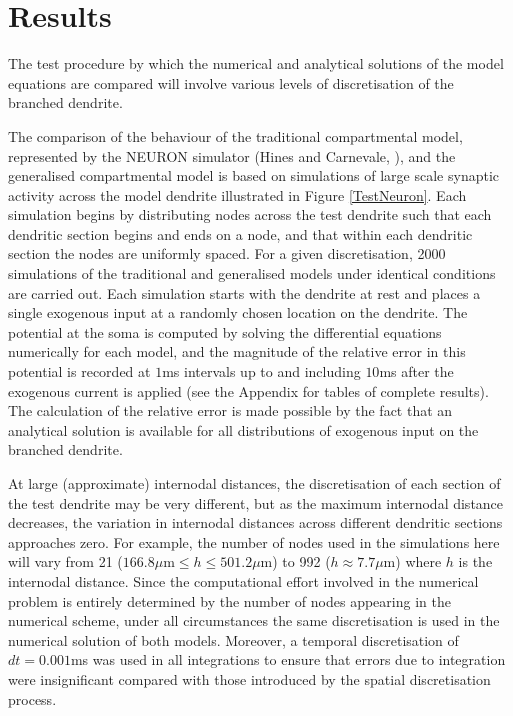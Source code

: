 \section{Results}
The test procedure by which the numerical and analytical solutions
of the model equations are compared will involve various levels of
discretisation of the branched dendrite.

The comparison of the behaviour of the traditional compartmental
model, represented by the NEURON simulator (Hines and Carnevale,
\cite{Hines97}), and the generalised compartmental model is based
on simulations of large scale synaptic activity across the model
dendrite illustrated in Figure \ref{TestNeuron}. Each simulation begins
by distributing nodes across the test dendrite such that each
dendritic section begins and ends on a node, and that within each
dendritic section the nodes are uniformly spaced. For a given
discretisation, 2000 simulations of the traditional and
generalised models under identical conditions are carried out.
Each simulation starts with the dendrite at rest and places a
single exogenous input at a randomly chosen location on the
dendrite. The potential at the soma is computed by solving the
differential equations numerically for each model, and the
magnitude of the relative error in this potential is recorded at
$1$ms intervals up to and including $10$ms after the exogenous
current is applied (see the Appendix for tables of complete
results). The calculation of the relative error is made possible
by the fact that an analytical solution is available for all
distributions of exogenous input on the branched dendrite.

At large (approximate) internodal distances, the discretisation of
each section of the test dendrite may be very different, but as
the maximum internodal distance decreases, the variation in
internodal distances across different dendritic sections
approaches zero. For example, the number of nodes used in the
simulations here will vary from 21 ($166.8\mu\mbox{m}\le h \le
501.2\mu$m) to 992 ($h\approx7.7\mu$m) where $h$ is the internodal
distance. Since the computational effort involved in the numerical
problem is entirely determined by the number of nodes appearing in
the numerical scheme, under all circumstances the same
discretisation is used in the numerical solution of both models.
Moreover, a temporal discretisation of $dt=0.001$ms was used in
all integrations to ensure that errors due to integration were
insignificant compared with those introduced by the spatial
discretisation process.

